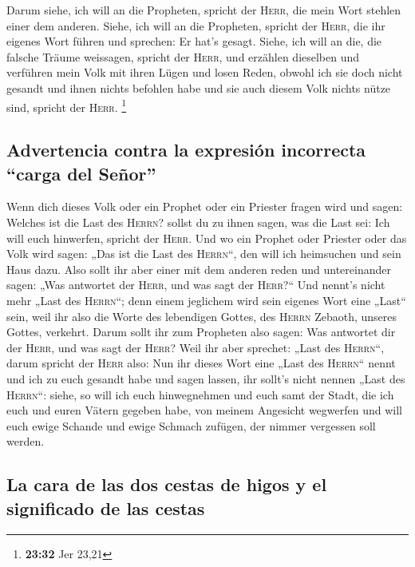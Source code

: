  Darum siehe, ich will an die Propheten, spricht der
\textsc{Herr}, die mein Wort stehlen einer dem anderen. 
Siehe, ich will an die Propheten, spricht der \textsc{Herr}, die ihr
eigenes Wort führen und sprechen: Er hat's gesagt. 
Siehe, ich will an die, die falsche Träume weissagen, spricht der
\textsc{Herr}, und erzählen dieselben und verführen mein Volk mit ihren
Lügen und losen Reden, obwohl ich sie doch nicht gesandt und ihnen
nichts befohlen habe und sie auch diesem Volk nichts nütze sind, spricht
der \textsc{Herr}. \footnote{\textbf{23:32} Jer 23,21}

\hypertarget{advertencia-contra-la-expresiuxf3n-incorrecta-carga-del-seuxf1or}{%
\subsection{Advertencia contra la expresión incorrecta ``carga del
Señor''}\label{advertencia-contra-la-expresiuxf3n-incorrecta-carga-del-seuxf1or}}

 Wenn dich dieses Volk oder ein Prophet oder ein Priester
fragen wird und sagen: Welches ist die Last des \textsc{Herrn}? sollst
du zu ihnen sagen, was die Last sei: Ich will euch hinwerfen, spricht
der \textsc{Herr}.  Und wo ein Prophet oder Priester oder
das Volk wird sagen: „Das ist die Last des \textsc{Herrn}``, den will
ich heimsuchen und sein Haus dazu.  Also sollt ihr aber
einer mit dem anderen reden und untereinander sagen: „Was antwortet der
\textsc{Herr}, und was sagt der \textsc{Herr}?{}``  Und
nennt's nicht mehr „Last des \textsc{Herrn}``; denn einem jeglichem wird
sein eigenes Wort eine „Last`` sein, weil ihr also die Worte des
lebendigen Gottes, des \textsc{Herrn} Zebaoth, unseres Gottes, verkehrt.
 Darum sollt ihr zum Propheten also sagen: Was antwortet
dir der \textsc{Herr}, und was sagt der \textsc{Herr}? 
Weil ihr aber sprechet: „Last des \textsc{Herrn}``, darum spricht der
\textsc{Herr} also: Nun ihr dieses Wort eine „Last des \textsc{Herrn}``
nennt und ich zu euch gesandt habe und sagen lassen, ihr sollt's nicht
nennen „Last des \textsc{Herrn}``:  siehe, so will ich
euch hinwegnehmen und euch samt der Stadt, die ich euch und euren Vätern
gegeben habe, von meinem Angesicht wegwerfen  und will
euch ewige Schande und ewige Schmach zufügen, der nimmer vergessen soll
werden.

\hypertarget{la-cara-de-las-dos-cestas-de-higos-y-el-significado-de-las-cestas}{%
\subsection{La cara de las dos cestas de higos y el significado de las
cestas}\label{la-cara-de-las-dos-cestas-de-higos-y-el-significado-de-las-cestas}}


